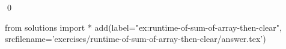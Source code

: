 \begin{ex}
  \label{ex:runtime-of-sum-of-array-then-clear}
  
\mbox{}\\ \\
\qed
\end{ex}
\begin{python0}
from solutions import *
add(label="ex:runtime-of-sum-of-array-then-clear",
    srcfilename='exercises/runtime-of-sum-of-array-then-clear/answer.tex') 
\end{python0}                              
